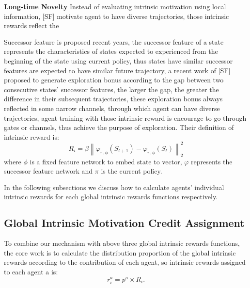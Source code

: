 \documentclass{article} %
\begin{document}
\textbf{Long-time Novelty} Instead of evaluating intrinsic motivation using local information, [SF] motivate agent to have diverse trajectories, those intrinsic rewards
reflect the 

Successor feature is proposed recent years, the successor feature of a state represents the characteristics of states expected to experienced from the beginning of the state using current policy, thus states have similar successor features are expected to have similar future trajectory, a recent work of [SF] proposed to generate exploration bonus according to the gap between two consecutive states' successor features, the larger the gap, the greater the difference in their subsequent trajectories, these exploration bonus always reflected in some narrow channels, through which agent can have diverse trajectories, agent training with those intrinsic reward is encourage to go through gates or channels, thus achieve the purpose of exploration. Their definition of intrinsic reward is:
\begin{equation}
\label{equation:4}
    R_{i}=\beta\left\|\varphi_{\pi, \phi}\left(S_{t+1}\right)-\varphi_{\pi, \phi}\left(S_{t}\right)\right\|_{2}^{2}
\end{equation}
where $\phi$ is a fixed feature network to embed state to vector, $\varphi$ represents the successor feature network and $\pi$ is the current policy.

In the following subsections we discuss how to calculate agents' individual intrinsic rewards for each global intrinsic rewards functions respectively. 


\subsection{Global Intrinsic Motivation Credit Assignment}
To combine our mechanism with above three global intrinsic rewards functions, the core work is to calculate the distribution proportion of the global intrinsic rewards according to the contribution of each agent, so intrinsic rewards assigned to each agent a is:
\begin{equation}
\label{equation:5}
    r_{i}^{a}=p^{a} \times R_{i}.
\end{equation}
\end{document}
